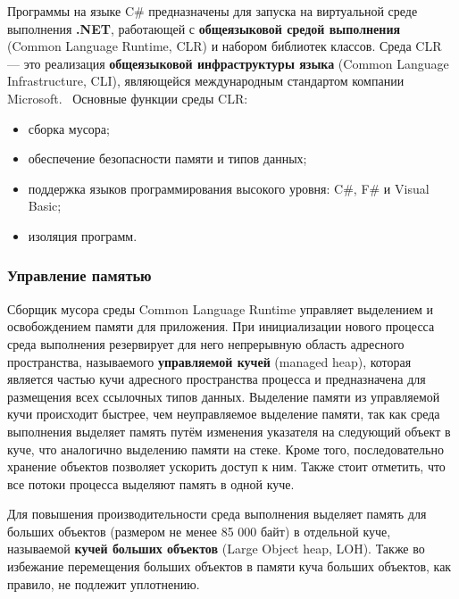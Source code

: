 Программы на языке C\# предназначены для запуска на виртуальной среде выполнения \textbf{.NET}, работающей с \textbf{общеязыковой средой выполнения} (Common Language Runtime, CLR) и набором библиотек классов. Среда CLR --- это реализация \textbf{общеязыковой инфраструктуры языка} (Common Language Infrastructure, CLI), являющейся международным стандартом компании Microsoft.~\cite{dotnet_tour} Основные функции среды CLR:~\cite{dotnet_intro}~\cite{dotnet_clr_intro}

\begin{itemize}[label*=---]
	\item сборка мусора;
	\item обеспечение безопасности памяти и типов данных;
	\item поддержка языков программирования высокого уровня: C\#, F\# и Visual Basic;
	\item изоляция программ.
\end{itemize}

\subsubsection*{Управление памятью}
\label{loh}

Сборщик мусора среды Common Language Runtime управляет выделением и освобождением памяти для приложения. При инициализации нового процесса среда выполнения резервирует для него непрерывную область адресного пространства, называемого \textbf{управляемой кучей} (managed heap), которая является частью кучи адресного пространства процесса и предназначена для размещения всех ссылочных типов данных. Выделение памяти из управляемой кучи происходит быстрее, чем неуправляемое выделение памяти, так как среда выполнения выделяет память путём изменения указателя на следующий объект в куче, что аналогично выделению памяти на стеке. Кроме того, последовательно хранение объектов позволяет ускорить доступ к ним. Также стоит отметить, что все потоки процесса выделяют память в одной куче.~\cite{dotnet_memory}

Для повышения производительности среда выполнения выделяет память для больших объектов (размером не менее 85 000 байт) в отдельной куче, называемой \textbf{кучей больших объектов} (Large Object heap, LOH). Также во избежание перемещения больших объектов в памяти куча больших объектов, как правило, не подлежит уплотнению.~\cite{dotnet_loh}



